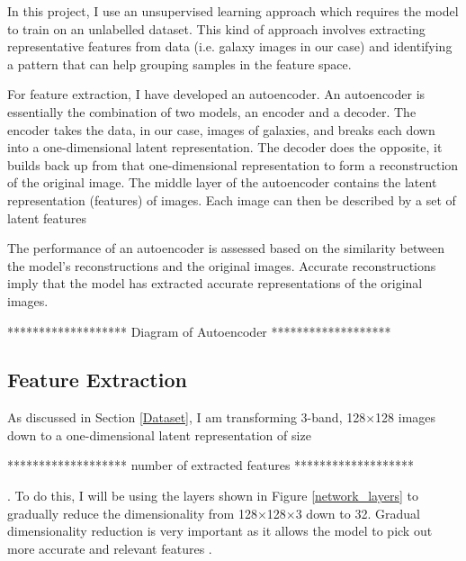 \documentclass[12pt, onecolumn]{article}
\begin{document}
    In this project, I use an unsupervised learning approach which requires the model to train on an unlabelled dataset. This kind of approach involves extracting representative features from data (i.e. galaxy images in our case) and identifying a pattern that can help grouping samples in the feature space.

    For feature extraction, I have developed an autoencoder. An autoencoder is essentially the combination of two models, an encoder and a decoder. The encoder takes the data, in our case, images of galaxies, and breaks each down into a one-dimensional latent representation. The decoder does the opposite, it builds back up from that one-dimensional representation to form a reconstruction of the original image. The middle layer of the autoencoder contains the latent representation (features) of images. Each image can then be described by a set of latent features

    The performance of an autoencoder is assessed based on the similarity between the model's reconstructions and the original images. Accurate reconstructions imply that the model has extracted accurate representations of the original images.



    \vspace{10mm}
    *******************
    Diagram of Autoencoder
    *******************
    \vspace{10mm}


    
    
    
    \subsection{Feature Extraction}
    \label{Feature Extraction}

        As discussed in Section \ref{Dataset}, I am transforming 3-band, 128$\times$128 images down to a one-dimensional latent representation of size 
        
        \vspace{5mm}
        *******************
        number of extracted features 
        *******************
        \vspace{5mm}
        
        . To do this, I will be using the layers shown in Figure \ref{network_layers}  to gradually reduce the dimensionality from 128$\times$128$\times$3 down to 32. Gradual dimensionality reduction is very important as it allows the model to pick out more accurate and relevant features \cite{dnn_feature_extraction}.
        
\end{document}
